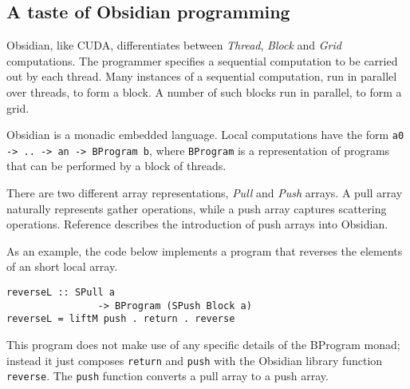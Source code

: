 
\subsection{A taste of Obsidian programming}

Obsidian, like CUDA, differentiates between {\em Thread}, {\em Block} and 
{\em Grid} computations. The programmer specifies a sequential computation 
to be carried out by each thread. Many instances of a sequential computation,  
run in parallel over threads, to form a block. A number of such blocks run in 
parallel, to form a grid. 

Obsidian is a monadic embedded language. Local computations have the form 
{\tt a0 -> .. -> an -> BProgram b}, where {\tt BProgram}
is a representation of programs that can be performed by a block of threads.

There are two different array representations, {\em Pull} and 
{\em Push} arrays. A pull array naturally represents gather operations,
while a push array captures scattering operations. Reference  
describes the introduction of push arrays into Obsidian.  

As an example, the code below implements a program that reverses the elements 
of an short local array. 


\begin{small}
\begin{verbatim}
reverseL :: SPull a
                -> BProgram (SPush Block a)
reverseL = liftM push . return . reverse 
\end{verbatim} 
\end{small} 


This program does not make use of any specific details of the BProgram monad; 
instead it just composes {\tt return} and {\tt push} with the Obsidian library 
function {\tt reverse}. The {\tt push} function converts a pull array to a push 
array.

